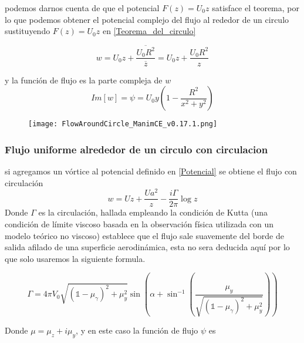 \documentclass[12pt]{article}
\begin{document}
		podemos darnos cuenta de que el potencial $F(z)= U_0 z$ satisface el teorema, por lo que podemos obtener el potencial complejo  del flujo al rededor de un circulo sustituyendo $F(z)= U_0 z$ en \ref*{Teorema_del_circulo} 

		\begin{equation}
			w = U_0 z + \frac{\overline{U_0 R^2} }{\overline{z} } = U_0 z +\frac{U_0 R^2}{z} 
		\end{equation}

		y la función de flujo es la parte compleja de $w$
		\begin{equation}
			Im[w]=\psi =  U_0 y \left( 1- \frac{R^2}{x^2 + y^2}\right)
			\label{Potencial}
		\end{equation}
		

		\begin{figure}[!h]
			\begin{small}
				\begin{center}
					\texttt{[image: FlowAroundCircle\_ManimCE\_v0.17.1.png]}
				\end{center}
				\caption{}
				\label{fig:}
			\end{small}
		\end{figure}
		
		\subsubsection{Flujo uniforme alrededor de un circulo con circulacion}
			si agregamos un vórtice al potencial definido en \ref{Potencial} se obtiene el flujo con circulación
			\begin{equation}
				w = Uz + \frac{ Ua^2}{z} - \frac{i \Gamma}{2 \pi}\log z
			\end{equation}
			Donde  $\Gamma$ es la circulación, hallada empleando la condición de Kutta (una condición de límite viscoso basada en la observación física utilizada con un modelo teórico no viscoso) establece que el flujo sale suavemente del borde de salida afilado de una superficie aerodinámica, esta no sera deducida aquí por lo que solo usaremos la siguiente formula.

			\begin{equation}
				\Gamma=4 \pi V_0 \sqrt{\left(\mathbb{1}-\mu_\gamma\right)^2+\mu_y^2} \sin \left(\alpha+\sin ^{-1}\left(\frac{\mu_y}{\sqrt{\left(\mathbb{1}-\mu_\gamma\right)^2+\mu_y^2}}\right)\right) 
				\label{eq:}
			\end{equation}

			Donde $\mu=\mu_z+i \mu_y$, y en este caso la función de flujo $ \psi $ es 
			
\end{document}
